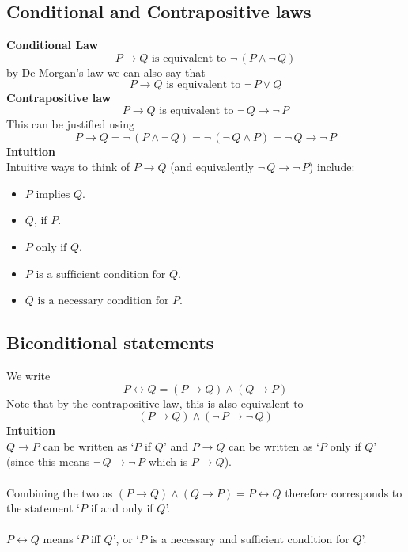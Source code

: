 \documentclass{report}
\theoremstyle{definition}
\begin{document}
\subsection{Conditional and Contrapositive laws}
\textbf{Conditional Law}
\begin{equation*}
P\to Q\text{ is equivalent to }\neg\,(P\land\neg\,Q)
\end{equation*}
by De Morgan's law we can also say that
\begin{equation*}
P\to Q\text{ is equivalent to }\neg\,P\lor Q
\end{equation*}
\textbf{Contrapositive law}
\begin{equation*}
P\to Q\text{ is equivalent to }\neg\,Q\to\neg\,P
\end{equation*}
This can be justified using
\begin{equation*}
P\to Q=\neg\,(P\land\neg\,Q)=\neg\,(\neg\,Q\land P)=\neg\,Q\to\neg\,P
\end{equation*}
\textbf{Intuition}\\
Intuitive ways to think of $P\to Q$ (and equivalently $\neg\,Q\to\neg\,P$) include:
\begin{itemize}
\item $P\text{ implies }Q$.
\item $Q\text{, if }P$.
\item $P\text{ only if }Q$.
\item $P\text{ is a sufficient condition for }Q$.
\item $Q\text{ is a necessary condition for }P$.
\end{itemize}
\newpage

\subsection{Biconditional statements}
We write
\begin{equation*}
P\leftrightarrow Q=(P\to Q)\land(Q\to P)
\end{equation*}
Note that by the contrapositive law, this is also equivalent to
\begin{equation*}
(P\to Q)\land(\neg\,P\to\neg\,Q)
\end{equation*}
\textbf{Intuition}\\
$Q\to P$ can be written as `$P$ if $Q$' and $P\to Q$ can be written as `$P$ only if $Q$' (since this means $\neg\,Q\to\neg\,P$ which is $P\to Q$).\\
\vspace{1mm}\\
Combining the two as $(P\to Q)\land(Q\to P)=P\leftrightarrow Q$ therefore corresponds to the statement 
`$P$ if and only if $Q$'.\\
\vspace{1mm}\\
$P\leftrightarrow Q$ means `$P$ iff $Q$', or `$P$ is a necessary and sufficient condition for $Q$'.
\newpage
\end{document}
